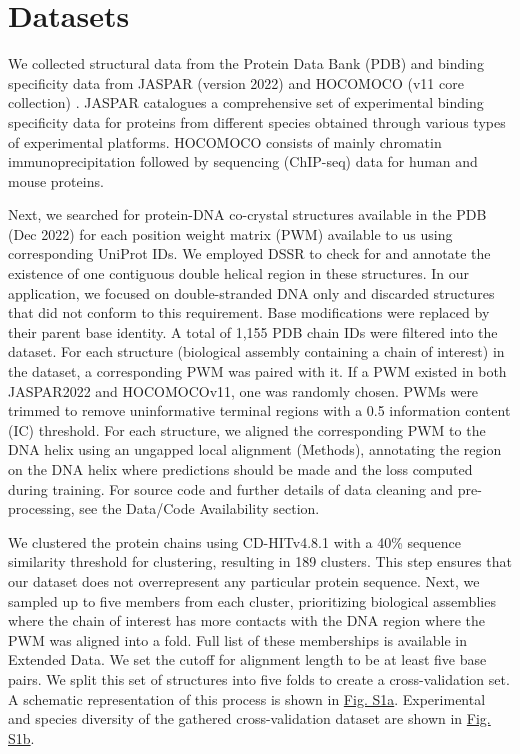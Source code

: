 \section{Datasets}
We collected structural data from the Protein Data Bank (PDB) \citep{Berman2000} and binding specificity data from JASPAR (version 2022) \citep{Jaime2022}  and HOCOMOCO (v11 core collection) \citep{kulakovskiy2018hocomoco}. JASPAR catalogues a comprehensive set of experimental binding specificity data for proteins from different species obtained through various types of experimental platforms. HOCOMOCO consists of mainly chromatin immunoprecipitation followed by sequencing (ChIP-seq) \citep{Park2009} data for human and mouse proteins.
\par
Next, we searched for protein-DNA co-crystal structures available in the PDB (Dec 2022) for each position weight matrix (PWM) available to us using corresponding UniProt IDs. We employed DSSR \citep{lu2015dssr} to check for and annotate the existence of one contiguous double helical region in these structures. In our application, we focused on double-stranded DNA only and discarded structures that did not conform to this requirement. Base modifications were replaced by their parent base identity. A total of 1,155 PDB chain IDs were filtered into the dataset. For each structure (biological assembly containing a chain of interest) in the dataset, a corresponding PWM was paired with it. If a PWM existed in both JASPAR2022 and HOCOMOCOv11, one was randomly chosen. PWMs were trimmed to remove uninformative terminal regions with a 0.5 information content (IC) threshold. For each structure, we aligned the corresponding PWM to the DNA helix using an ungapped local alignment (Methods), annotating the region on the DNA helix where predictions should be made and the loss computed during training. For source code and further details of data cleaning and pre-processing, see the Data/Code Availability section.
\par
We clustered the protein chains using CD-HITv4.8.1 \citep{fu2012cd} with a 40\% sequence similarity threshold for clustering, resulting in 189 clusters. This step ensures that our dataset does not overrepresent any particular protein sequence. Next, we sampled up to five members from each cluster, prioritizing biological assemblies where the chain of interest has more contacts with the DNA region where the PWM was aligned into a fold. Full list of these memberships is available in Extended Data. We set the cutoff for alignment length to be at least five base pairs. We split this set of structures into five folds to create a cross-validation set. A schematic representation of this process is shown in \hyperref[fig:pdnaS1]{Fig. S1a}. Experimental and species diversity of the gathered cross-validation dataset are shown in \hyperref[fig:pdnaS1]{Fig. S1b}.
